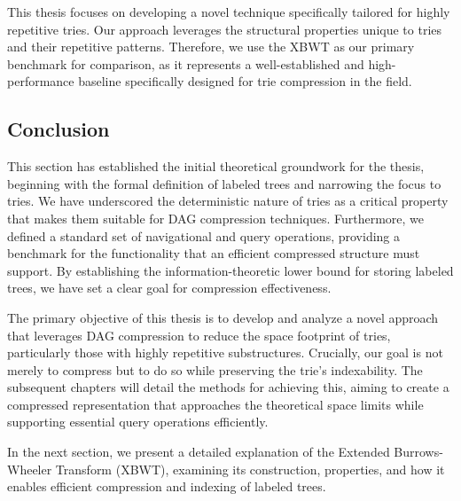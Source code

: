 This thesis focuses on developing a novel technique specifically tailored for highly repetitive tries. Our approach leverages the structural properties unique to tries and their repetitive patterns. Therefore, we use the XBWT as our primary benchmark for comparison, as it represents a well-established and high-performance baseline specifically designed for trie compression in the field.

\subsection{Conclusion}
This section has established the initial theoretical groundwork for the thesis, beginning with the formal definition of labeled trees and narrowing the focus to tries. We have underscored the deterministic nature of tries as a critical property that makes them suitable for DAG compression techniques. Furthermore, we defined a standard set of navigational and query operations, providing a benchmark for the functionality that an efficient compressed structure must support. By establishing the information-theoretic lower bound for storing labeled trees, we have set a clear goal for compression effectiveness.

The primary objective of this thesis is to develop and analyze a novel approach that leverages DAG compression to reduce the space footprint of tries, particularly those with highly repetitive substructures. Crucially, our goal is not merely to compress but to do so while preserving the trie's indexability. The subsequent chapters will detail the methods for achieving this, aiming to create a compressed representation that approaches the theoretical space limits while supporting essential query operations efficiently.

In the next section, we present a detailed explanation of the Extended Burrows-Wheeler Transform (XBWT), examining its construction, properties, and how it enables efficient compression and indexing of labeled trees.

